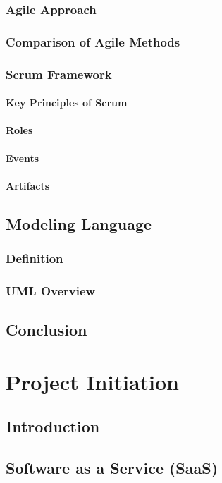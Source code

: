 \documentclass[a4paper,12pt]{report}
\begin{document}
\subsection{Agile Approach}
\subsection{Comparison of Agile Methods}
\subsection{Scrum Framework}
\subsubsection{Key Principles of Scrum}
\subsubsection{Roles}
\subsubsection{Events}
\subsubsection{Artifacts}
\section{Modeling Language}
\subsection{Definition}
\subsection{UML Overview}
\section{Conclusion}

\chapter{Project Initiation}

\section{Introduction}
\section{Software as a Service (SaaS)}
\end{document}
